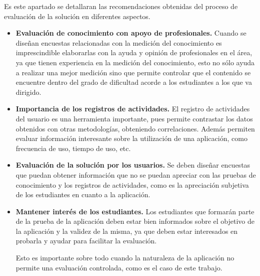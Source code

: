 Es este apartado se detallaran las recomendaciones obtenidas del proceso de
evaluación de la solución en diferentes aspectos. 

\begin{itemize}

\item \textbf{Evaluación de conocimiento con apoyo de profesionales.} Cuando se
    diseñan encuestas relacionadas con la medición del conocimiento es
    imprescindible elaborarlas con la ayuda y opinión de profesionales en el
    área, ya que tienen experiencia en la medición del conocimiento, esto no
    sólo ayuda a realizar una mejor medición sino que permite controlar que el
    contenido se encuentre dentro del grado de dificultad acorde a los
    estudiantes a los que va dirigido. 

\item \textbf{Importancia de los registros de actividades.} El registro de
    actividades del usuario es una herramienta importante, pues permite
    contrastar los datos obtenidos con otras metodologías, obteniendo
    correlaciones. Además permiten evaluar información interesante sobre la
    utilización de una aplicación, como frecuencia de uso, tiempo de uso, etc.

\item \textbf{Evaluación de la solución por los usuarios.} Se deben diseñar
    encuestas que puedan obtener información que no se puedan apreciar con las
    pruebas de conocimiento y los registros de actividades, como es la
    apreciación subjetiva de los estudiantes en cuanto a la aplicación.

\item \textbf{Mantener interés de los estudiantes.} Los estudiantes que formarán
    parte de la prueba de la aplicación deben estar bien informados sobre el
    objetivo de la aplicación y la validez de la misma, ya que deben estar
    interesados en probarla y ayudar para facilitar la evaluación. 

    Esto es importante sobre todo cuando la naturaleza de la aplicación no
    permite una evaluación controlada, como es el caso de este trabajo.
\end{itemize}
